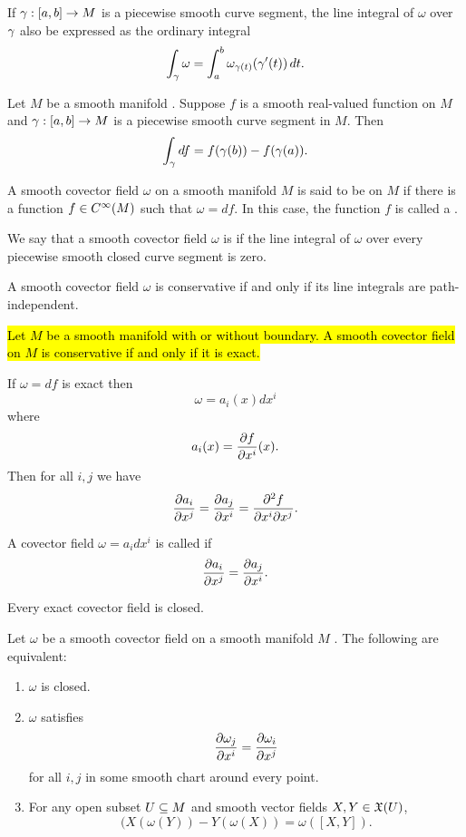 \begin{prop}
If $\gamma:[a,b]\rightarrow M$ is a piecewise smooth curve segment, the line integral of $\omega$ over $\gamma$ also be expressed as the ordinary integral
\[\int_\gamma \omega = \int_a^b \omega_{\gamma(t)}(\gamma^\prime(t))\,dt.\]
\end{prop}

\begin{thm}
Let $M$ be a smooth manifold \wowob. Suppose $f$ is a smooth real-valued function on $M$ and $\gamma:[a,b]\rightarrow M$ is a piecewise smooth curve segment in $M$. Then 
\[\int_\gamma df = f(\gamma(b)) - f(\gamma(a)).\]
\end{thm}

\dfng A smooth covector field $\omega$ on a smooth manifold $M$ \wowob is said to be  on $M$ if there is a function $f\in C^\infty(M)$ such that $\omega = df$. In this case, the function $f$ is called a .

\dfng We say that a smooth covector field $\omega$ is  if the line integral of $\omega$ over every piecewise smooth closed curve segment is zero.

\begin{prop}
A smooth covector field $\omega$ is conservative if and only if its line integrals are path-independent.
\end{prop}

\setcounter{thm}{41}

\begin{thm}
\hl{Let $M$ be a smooth manifold with or without boundary. A smooth covector field on $M$ is conservative if and only if it is exact.}
\end{thm}

\crly If $\omega = df$ is exact then 
\[\omega = a_i(x)dx^i\]
where 
\[a_i(x) = \frac{\partial{f}}{\partial{x^i}}(x).\]
Then for all $i,j$ we have
\[\frac{\partial{a_i}}{\partial{x^j}} = \frac{\partial{a_j}}{\partial{x^i}} = \frac{\partial^2 f}{\partial x^i \partial x^j}.\]

\dfn A covector field $\omega = a_i dx^i$ is called  if 
\[\frac{\partial{a_i}}{\partial{x^j}} = \frac{\partial{a_j}}{\partial{x^i}}.\]

\setcounter{thm}{43} 

\begin{prop}
Every exact covector field is closed.
\end{prop}

\begin{prop}
Let $\omega$ be a smooth covector field on a smooth manifold $M$ \wowob. The following are equivalent:
\begin{enumerate}
    \item $\omega$ is closed.
    \item $\omega$ satisfies
    \[\frac{\partial{\omega_j}}{\partial{x^i}} = \frac{\partial{\omega_i}}{\partial{x^j}}\]
    for all $i,j$ in some smooth chart around every point.
    \item For any open subset $U\subseteq M$ and smooth vector fields $X,Y\in \mathfrak{X}(U)$,
    \[(X(\omega(Y)) - Y(\omega(X)) = \omega([X,Y]).\]
\end{enumerate}
\end{prop}

